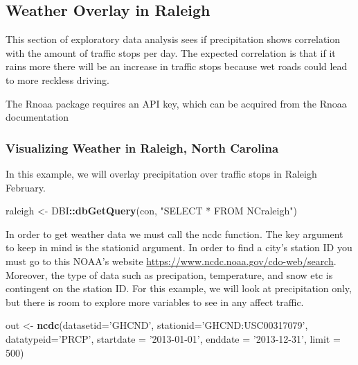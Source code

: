 \documentclass[
]{book}
\newenvironment{Shaded}{\begin{snugshade}}{\end{snugshade}}
\newcommand{\DataTypeTok}[1]{\textcolor[rgb]{0.13,0.29,0.53}{#1}}
\newcommand{\DecValTok}[1]{\textcolor[rgb]{0.00,0.00,0.81}{#1}}
\newcommand{\KeywordTok}[1]{\textcolor[rgb]{0.13,0.29,0.53}{\textbf{#1}}}
\newcommand{\NormalTok}[1]{#1}
\newcommand{\OperatorTok}[1]{\textcolor[rgb]{0.81,0.36,0.00}{\textbf{#1}}}
\newcommand{\StringTok}[1]{\textcolor[rgb]{0.31,0.60,0.02}{#1}}
\begin{document}
\hypertarget{weather-overlay-in-raleigh}{%
\subsection{Weather Overlay in Raleigh}\label{weather-overlay-in-raleigh}}

This section of exploratory data analysis sees if precipitation shows correlation with the amount of traffic stops per day. The expected correlation is that if it rains more there will be an increase in traffic stops because wet roads could lead to more reckless driving.

The Rnoaa package requires an API key, which can be acquired from the Rnoaa documentation

\hypertarget{visualizing-weather-in-raleigh-north-carolina}{%
\subsubsection{Visualizing Weather in Raleigh, North Carolina}\label{visualizing-weather-in-raleigh-north-carolina}}

In this example, we will overlay precipitation over traffic stops in Raleigh February.

\begin{Shaded}
\begin{Highlighting}[]
\NormalTok{raleigh <-}\StringTok{ }\NormalTok{DBI}\OperatorTok{::}\KeywordTok{dbGetQuery}\NormalTok{(con, }\StringTok{"SELECT * FROM NCraleigh"}\NormalTok{)}
\end{Highlighting}
\end{Shaded}

In order to get weather data we must call the ncdc function. The key argument to keep in mind is the stationid argument. In order to find a city's station ID you must go to this NOAA's website \url{https://www.ncdc.noaa.gov/cdo-web/search}. Moreover, the type of data such as precipation, temperature, and snow etc is contingent on the station ID. For this example, we will look at precipitation only, but there is room to explore more variables to see in any affect traffic.

\begin{Shaded}
\begin{Highlighting}[]
\NormalTok{out <-}\StringTok{ }\KeywordTok{ncdc}\NormalTok{(}\DataTypeTok{datasetid=}\StringTok{'GHCND'}\NormalTok{, }\DataTypeTok{stationid=}\StringTok{'GHCND:USC00317079'}\NormalTok{, }\DataTypeTok{datatypeid=}\StringTok{'PRCP'}\NormalTok{, }\DataTypeTok{startdate =} \StringTok{'2013-01-01'}\NormalTok{, }\DataTypeTok{enddate =} \StringTok{'2013-12-31'}\NormalTok{, }\DataTypeTok{limit =} \DecValTok{500}\NormalTok{)}
\end{Highlighting}
\end{Shaded}
\end{document}
